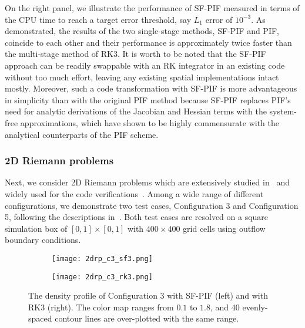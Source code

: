 \documentclass[times,preprint,3p]{elsarticle}
\begin{document}
On the right panel, we illustrate the performance of SF-PIF
measured in terms of the CPU time to reach a target error threshold, say
$L_1$ error of $10^{-3}$.
As demonstrated, the results of the two single-stage methods,
SF-PIF and PIF, coincide to each other and their performance is
approximately twice faster than the multi-stage method of RK3.
It is worth to be noted that
the SF-PIF approach can be readily swappable with
an RK integrator in an existing code
without too much effort,
leaving any existing spatial implementations intact mostly.
Moreover, such a code transformation with SF-PIF is more advantageous
in simplicity than with the original PIF method
because SF-PIF replaces PIF's need for analytic
derivations of the Jacobian and Hessian terms with
the system-free approximations, which have shown to be
highly commensurate with the analytical counterparts of the PIF scheme.
%



\subsubsection{2D Riemann problems}\label{sec:2drp}
Next, we consider 2D Riemann problems which are extensively
studied in~\cite{zhang1990conjecture, schulz1993classification, schulz1993numerical}
and widely used for the code verifications~\cite{lee2017piecewise, balsara2010multidimensional, buchmuller2014improved, don2016hybrid,reyes2019variable}.
Among a wide range of different configurations,
we demonstrate %
two test cases,
Configuration 3 and Configuration 5,
following the descriptions
in~\cite{don2016hybrid,lee2017piecewise}.
%
Both test cases are resolved on a square simulation box of
\( \left[ 0, 1 \right] \times \left[ 0, 1 \right] \)
with \( 400 \times 400 \) grid cells using outflow boundary conditions.

\begin{figure}[ht!]
    \centering
    \begin{subfigure}{80mm}
        \centering
        \texttt{[image: 2drp\_c3\_sf3.png]}
    \end{subfigure}
    \begin{subfigure}{80mm}
        \centering
        \texttt{[image: 2drp\_c3\_rk3.png]}
    \end{subfigure}
    \caption{The density profile of Configuration 3
        with SF-PIF (left) and with RK3 (right).
        The color map ranges from \( 0.1 \) to \( 1.8 \), and
        40 evenly-spaced contour lines are over-plotted with
        the same range.
    }\label{fig:2drp_c3}
\end{figure}
%
\end{document}
